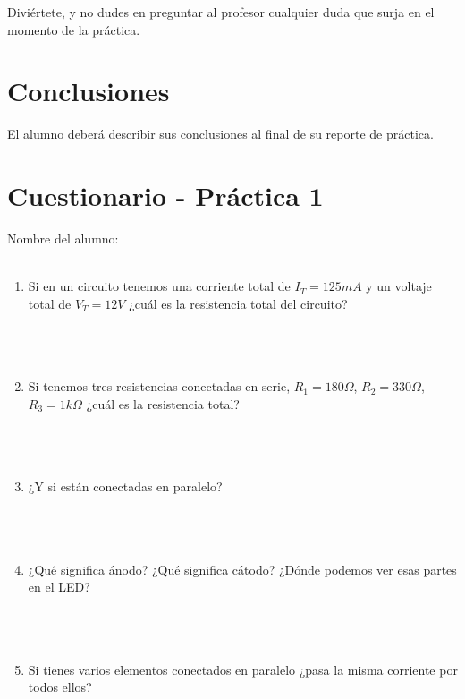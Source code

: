     Diviértete, y no dudes en preguntar al profesor cualquier duda que surja en el momento de la práctica. \\


\section{Conclusiones}
	El alumno deberá describir sus conclusiones al final de su reporte de práctica.

\begin{center}
	\huge \textthing
\end{center}


\clearpage
\section{Cuestionario - Práctica 1}
	Nombre del alumno: \\[0.2cm]
	\horrule{0.5pt} \\[0.2cm] %

	\begin{enumerate}
		\item Si en un circuito tenemos una corriente total de $I_T = 125 mA$ y un voltaje total de $V_T = 12 V$ ¿cuál es la resistencia total del circuito? \\ \\ \\ \\
		\item Si tenemos tres resistencias conectadas en serie, $R_1 = 180 \Omega$, $R_2 = 330 \Omega$, $R_3 = 1 k \Omega$ ¿cuál es la resistencia total? \\ \\ \\ \\
		\item ¿Y si están conectadas en paralelo? \\ \\ \\ \\
		\item ¿Qué significa ánodo? ¿Qué significa cátodo? ¿Dónde podemos ver esas partes en el LED? \\ \\ \\ \\
		\item Si tienes varios elementos conectados en paralelo ¿pasa la misma corriente por todos ellos? \\
	\end{enumerate}
    
